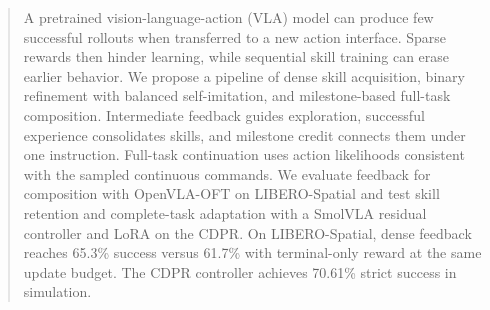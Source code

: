 \begin{abstract}
A pretrained vision-language-action (VLA) model can produce few successful rollouts when transferred to a new action interface. Sparse rewards then hinder learning, while sequential skill training can erase earlier behavior. We propose a pipeline of dense skill acquisition, binary refinement with balanced self-imitation, and milestone-based full-task composition. Intermediate feedback guides exploration, successful experience consolidates skills, and milestone credit connects them under one instruction. Full-task continuation uses action likelihoods consistent with the sampled continuous commands. We evaluate feedback for composition with OpenVLA-OFT on LIBERO-Spatial and test skill retention and complete-task adaptation with a SmolVLA residual controller and LoRA on the CDPR. On LIBERO-Spatial, dense feedback reaches 65.3\% success versus 61.7\% with terminal-only reward at the same update budget. The CDPR controller achieves 70.61\% strict success in simulation.
\end{abstract}

